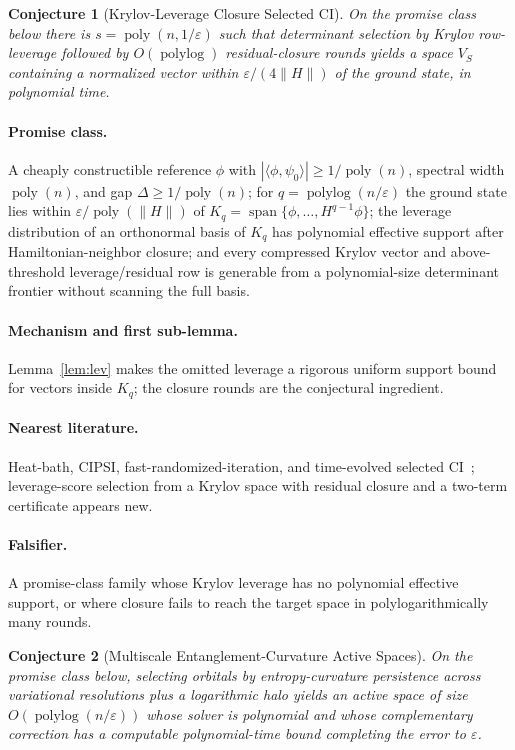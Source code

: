 \documentclass[11pt]{article}
\newtheorem{conjecture}{Conjecture}
\theoremstyle{definition}
\newcommand{\eps}{\varepsilon}
\newcommand{\poly}{\operatorname{poly}}
\newcommand{\polylog}{\operatorname{polylog}}
\begin{document}
\begin{conjecture}[Krylov-Leverage Closure Selected CI]\label{p2}
On the promise class below there is $s=\poly(n,1/\eps)$ such that determinant
selection by Krylov row-leverage followed by $O(\polylog)$ residual-closure rounds
yields a space $V_S$ containing a normalized vector within $\eps/(4\lVert H\rVert)$
of the ground state, in polynomial time.
\end{conjecture}
\paragraph{Promise class.}  A cheaply constructible reference $\phi$ with
$|\langle\phi,\psi_0\rangle|\ge1/\poly(n)$, spectral width $\poly(n)$, and gap
$\Delta\ge1/\poly(n)$; for $q=\polylog(n/\eps)$ the ground state lies within
$\eps/\poly(\lVert H\rVert)$ of $K_q=\operatorname{span}\{\phi,\dots,H^{q-1}\phi\}$;
the leverage distribution of an orthonormal basis of $K_q$ has polynomial
effective support after Hamiltonian-neighbor closure; and every compressed Krylov
vector and above-threshold leverage/residual row is generable from a
polynomial-size determinant frontier without scanning the full basis.
\paragraph{Mechanism and first sub-lemma.}  Lemma~\ref{lem:lev} makes the omitted
leverage a rigorous uniform support bound for vectors inside $K_q$; the closure
rounds are the conjectural ingredient.
\paragraph{Nearest literature.}  Heat-bath, CIPSI, fast-randomized-iteration, and
time-evolved selected CI~\cite{R7,R8,R9}; leverage-score selection from a Krylov
space with residual closure and a two-term certificate appears new.
\paragraph{Falsifier.}  A promise-class family whose Krylov leverage has no
polynomial effective support, or where closure fails to reach the target space in
polylogarithmically many rounds.

\begin{conjecture}[Multiscale Entanglement-Curvature Active Spaces]\label{p3}
On the promise class below, selecting orbitals by entropy-curvature persistence
across variational resolutions plus a logarithmic halo yields an active space of
size $O(\polylog(n/\eps))$ whose solver is polynomial and whose complementary
correction has a computable polynomial-time bound completing the error to $\eps$.
\end{conjecture}
\end{document}
